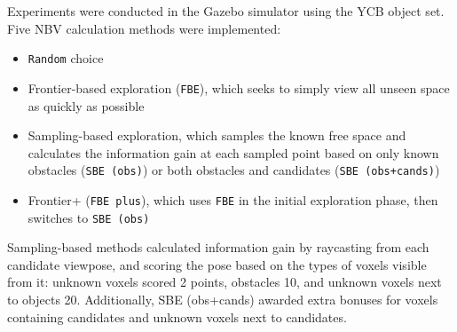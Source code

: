 
Experiments were conducted in the Gazebo simulator using the YCB object set\cite{calli2015benchmarking}.
Five NBV calculation methods were implemented: 
\begin{itemize}
	\item \texttt{Random} choice
	\item Frontier-based exploration (\texttt{FBE}), which seeks to simply view all unseen space as quickly as possible
	\item Sampling-based exploration, which samples the known free space and calculates the information gain at each sampled point based on only known obstacles (\texttt{SBE (obs)}) or both obstacles and candidates (\texttt{SBE (obs+cands)})
	\item Frontier+ (\texttt{FBE plus}), which uses \texttt{FBE} in the initial exploration phase, then switches to \texttt{SBE (obs)}
\end{itemize}
Sampling-based methods calculated information gain by raycasting from each candidate viewpose, and scoring the pose based on the types of voxels visible from it: unknown voxels scored 2 points, obstacles 10, and unknown voxels next to objects 20.
Additionally, SBE (obs+cands) awarded extra bonuses for voxels containing candidates and unknown voxels next to candidates.